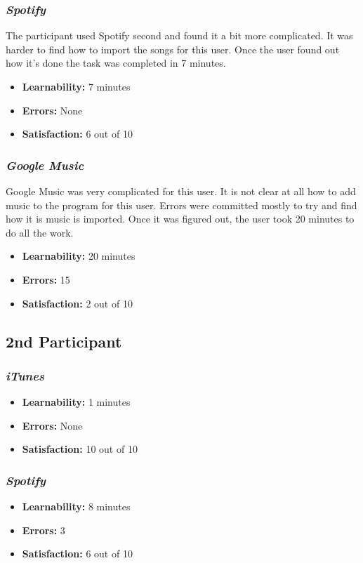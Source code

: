 \documentclass{article}
\begin{document}
{\begin{multicols}{2}
\subsubsection{\it Spotify}
The participant used Spotify second and found it a bit more complicated. It was harder to find how to import the songs for this user. Once the user found out how it’s done the task was completed in 7 minutes.
\begin{itemize}
	\item {\bf Learnability:} 7 minutes
	\item {\bf Errors:} None
	\item {\bf Satisfaction:} 6 out of 10 
\end{itemize}

\subsubsection{\it Google Music}
Google Music was very complicated for this user. It is not clear at all how to add music to the program for this user. Errors were committed mostly to try and find how it is music is imported. Once it was figured out, the user took 20 minutes to do all the work.
\begin{itemize}
\item {\bf Learnability:} 20 minutes
	\item {\bf Errors:} 15
	\item {\bf Satisfaction:} 2 out of 10 
\end{itemize} 

\subsection{2nd Participant}

\subsubsection{\it iTunes}
\begin{itemize}
	\item {\bf Learnability:} 1 minutes
	\item {\bf Errors:}  None
	\item {\bf Satisfaction:} 10 out of 10 
\end{itemize}

\subsubsection{\it Spotify}
\begin{itemize}
	\item {\bf Learnability:} 8 minutes
	\item {\bf Errors:} 3
	\item {\bf Satisfaction:} 6 out of 10 
\end{itemize}


\end{multicols}}
\end{document}
